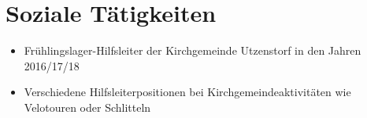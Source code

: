 \documentclass{article}
\begin{document}
\section{Soziale T\"atigkeiten}
\begin{itemize}
    \item Fr\"uhlingslager-Hilfsleiter der Kirchgemeinde Utzenstorf in den Jahren 2016/17/18
    \item Verschiedene Hilfsleiterpositionen bei Kirchgemeindeaktivit\"aten wie Velotouren oder Schlitteln
\end{itemize}
\end{document}
